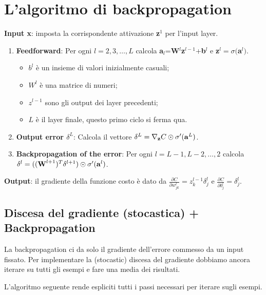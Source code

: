 \section{L'algoritmo di backpropagation}
\textbf{Input x}: imposta la corrispondente attivazione \textbf{z$^1$} per l'input layer.
\begin{enumerate}
    \item \textbf{Feedforward}: Per ogni $l=2,3,\dots,L$ calcola \textbf{a}$_l$=\textbf{W}$^l$\textbf{z}$^{l-1}$+\textbf{b}$^l$ e \textbf{z}$^l=\sigma($\textbf{a}$^l)$.
    \begin{itemize}
        \item $b^l$ è un insieme di valori inizialmente casuali;
        \item $W^l$ è una matrice di numeri;
        \item $z^{l-1}$ sono gli output dei layer precedenti;
        \item $L$ è il layer finale, questo primo ciclo si ferma qua.
    \end{itemize}
    \item \textbf{Output error $\delta^L$}: Calcola il vettore $\delta^L=\nabla_\text{\textbf{z}}C\odot\sigma'(\text{\textbf{a}}^L)$.
    \item \textbf{Backpropagation of the error}: Per ogni $l=L-1,L-2,\dots,2$ calcola $\delta^l=((\text{\textbf{W}}^{l+1})^T \delta^{l+1})\odot\sigma'(\text{\textbf{a}}^l)$.
\end{enumerate}
\textbf{Output}: il gradiente della funzione costo è dato da $\frac{\partial C}{\partial w^l_{jk}}=z^{l-1}_k\delta^l_j$ e $\frac{\partial C}{\partial b^l_j}=\delta^l_j$.

\subsection{Discesa del gradiente (stocastica) + Backpropagation}
La backpropagation ci da solo il gradiente dell'errore commesso da un input fissato. Per implementare la (stocastic) discesa del gradiente dobbiamo ancora iterare su tutti gli esempi e fare una media dei risultati.



L'algoritmo seguente rende espliciti tutti i passi necessari per iterare sugli esempi.


